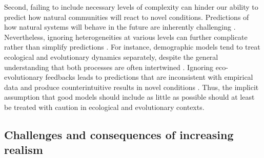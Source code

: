 \begin{refsection}
Second, failing to include necessary levels of complexity can hinder our ability to predict how natural communities will react to novel conditions. Predictions of how natural systems will behave in the future are inherently challenging \citep{sutherland2006predicting}. Nevertheless, ignoring heterogeneities at various levels can further complicate rather than simplify predictions \citep{d2018translucent}. For instance, demographic models tend to treat ecological and evolutionary dynamics separately, despite the general understanding that both processes are often intertwined \citep{macarthur1962some,kokko2007ecogenetic}. Ignoring eco-evolutionary feedbacks leads to predictions that are inconsistent with empirical data and produce counterintuitive results in novel conditions \citep{kokko2007ecogenetic}. Thus, the implicit assumption that good models should include as little as possible should at least be treated with caution in ecological and evolutionary contexts.



\subsection*{Challenges and consequences of increasing realism}


\end{refsection}
